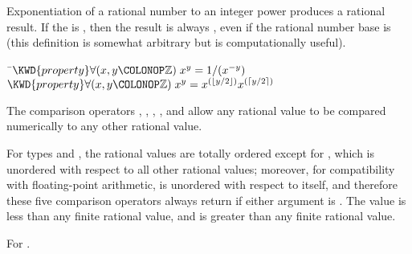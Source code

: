 Exponentiation of a rational number to an integer power produces a rational result.
If the  is , then the result is always , even if the rational number base is 
(this definition is somewhat arbitrary but is computationally useful).

\begin{Fortress}
{\tt~}\pushtabs\=\+\( \KWD{property} \forall(x, y\COLONOP\mathbb{Z})\; x^{y} = 1/(x^{-y})\)\\
\( \KWD{property} \forall(x, y\COLONOP\mathbb{Z})\; x^{y} = x^{(\lfloor y/2 \rfloor)} x^{(\lceil y/2 \rceil)}\)\-\\\poptabs
\end{Fortress}



The comparison operators \EXP{<}, \EXP{\leq}, \EXP{=}, \EXP{\geq}, and \EXP{>}
allow any rational value to be compared numerically to any other rational value.

For types  and ,
the rational values are totally ordered except for ,
which is unordered with respect to all other rational values;
moreover, for compatibility with floating-point arithmetic,  is
unordered with respect to itself, and therefore these five comparison operators
always return  if either argument is .
The value \EXP{-\infty} is less than any finite rational value,
and \EXP{+\infty} is greater than any finite rational value.

For \EXP{\neq} .


